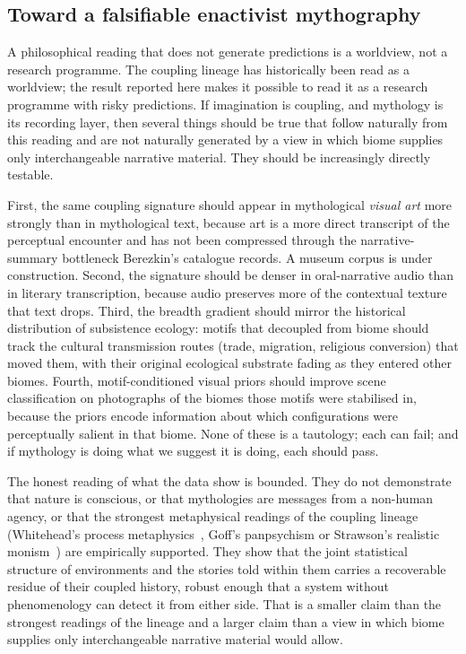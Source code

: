 \documentclass[11pt,a4paper]{article}
\begin{document}
\subsection*{Toward a falsifiable enactivist mythography}

A philosophical reading that does not generate predictions is a
worldview, not a research programme. The coupling lineage has
historically been read as a worldview; the result reported here
makes it possible to read it as a research programme with risky
predictions. If imagination is coupling, and mythology is its
recording layer, then several things should be true that follow
naturally from this reading and are not naturally generated by a
view in which biome supplies only interchangeable narrative
material. They should be increasingly directly testable.

First, the same coupling signature should appear in
mythological \emph{visual art} more strongly than in
mythological text, because art is a more direct transcript of
the perceptual encounter and has not been compressed through the
narrative-summary bottleneck Berezkin's catalogue records. A
museum corpus is under construction. Second, the signature
should be denser in oral-narrative audio than in literary
transcription, because audio preserves more of the contextual
texture that text drops. Third, the breadth gradient should
mirror the historical distribution of subsistence ecology:
motifs that decoupled from biome should track the cultural
transmission routes (trade, migration, religious conversion) that
moved them, with their original ecological substrate fading as
they entered other biomes. Fourth, motif-conditioned visual
priors should improve scene classification on photographs of the
biomes those motifs were stabilised in, because the priors
encode information about which configurations were perceptually
salient in that biome. None of these is a tautology; each can
fail; and if mythology is doing what we suggest it is doing,
each should pass.

The honest reading of what the data show is bounded. They do not
demonstrate that nature is conscious, or that mythologies are
messages from a non-human agency, or that the strongest
metaphysical readings of the coupling lineage (Whitehead's
process metaphysics~\citep{whitehead1929process}, Goff's
panpsychism or Strawson's realistic
monism~\citep{goff2019galileo,strawson2006realistic}) are
empirically supported. They show that the joint statistical
structure of environments and the stories told within them
carries a recoverable residue of their coupled history, robust
enough that a system without phenomenology can detect it from
either side. That is a smaller claim than the strongest readings
of the lineage and a larger claim than a view in which biome
supplies only interchangeable narrative material would allow.
\end{document}
